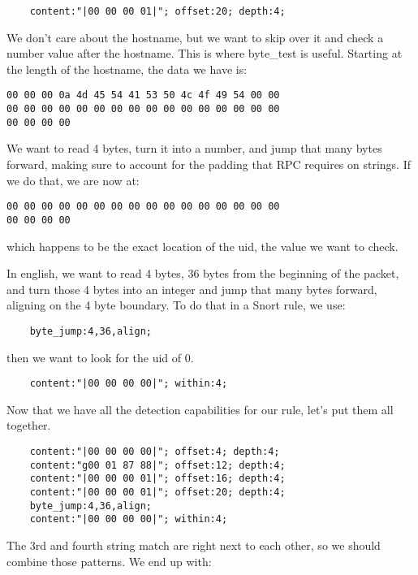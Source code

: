 \documentclass[english]{report}
\begin{document}
\begin{verbatim}
    content:"|00 00 00 01|"; offset:20; depth:4;
\end{verbatim}

We don't care about the hostname, but we want to skip over it and check a
number value after the hostname.  This is where byte\_test is useful.  Starting
at the length of the hostname, the data we have is:

\begin{verbatim}
00 00 00 0a 4d 45 54 41 53 50 4c 4f 49 54 00 00
00 00 00 00 00 00 00 00 00 00 00 00 00 00 00 00
00 00 00 00
\end{verbatim}

We want to read 4 bytes, turn it into a number, and jump that many bytes
forward, making sure to account for the padding that RPC requires on strings.
If we do that, we are now at:

\begin{verbatim}
00 00 00 00 00 00 00 00 00 00 00 00 00 00 00 00
00 00 00 00 
\end{verbatim}

which happens to be the exact location of the uid, the value we want to check.

In english, we want to read 4 bytes, 36 bytes from the beginning of the packet, and turn those 4 bytes into an integer and jump that many bytes forward, aligning on the 4 byte boundary.  To do that in a Snort rule, we use:

\begin{verbatim}
    byte_jump:4,36,align;
\end{verbatim}

then we want to look for the uid of 0.

\begin{verbatim}
    content:"|00 00 00 00|"; within:4;
\end{verbatim}

Now that we have all the detection capabilities for our rule, let's put them all together.  

\begin{verbatim}
    content:"|00 00 00 00|"; offset:4; depth:4;
    content:"g00 01 87 88|"; offset:12; depth:4;
    content:"|00 00 00 01|"; offset:16; depth:4;
    content:"|00 00 00 01|"; offset:20; depth:4;
    byte_jump:4,36,align;
    content:"|00 00 00 00|"; within:4;
\end{verbatim}

The 3rd and fourth string match are right next to each other, so we should combine those patterns.  We end up with:
\end{document}
